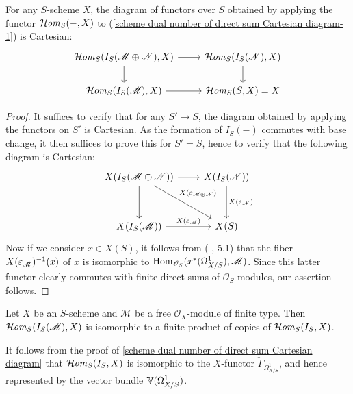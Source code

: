 \begin{proposition}\label{scheme dual number of direct sum Cartesian diagram}
For any $S$-scheme $X$, the diagram of functors over $S$ obtained by applying the functor $\operatorname{\mathcal{H}\hspace*{-0.4pt}\textit{om}\hspace{0.5pt}}_S(-,X)$ to (\ref{scheme dual number of direct sum Cartesian diagram-1}) is Cartesian:
\[\begin{tikzcd}
\sHom_S(I_S(\mathscr{M}\oplus\mathscr{N}),X)\ar[r]\ar[d]&\sHom_S(I_S(\mathscr{N}),X)\ar[d]\\
\sHom_S(I_S(\mathscr{M}),X)\ar[r]&\sHom_S(S,X)=X
\end{tikzcd}\]
\end{proposition}
\begin{proof}
It suffices to verify that for any $S'\to S$, the diagram obtained by applying the functors on $S'$ is Cartesian. As the formation of $I_S(-)$ commutes with base change, it then suffices to prove this for $S'=S$, hence to verify that the following diagram is Cartesian:
\[\begin{tikzcd}[row sep=12mm,column sep=8mm]
X(I_S(\mathscr{M}\oplus\mathscr{N}))\ar[r]\ar[d]\ar[rd,"X(\eps_{\mathscr{M}\oplus\mathscr{N}})",pos=0.4]&X(I_S(\mathscr{N}))\ar[d,"X(\eps_\mathscr{N})"]\\
X(I_S(\mathscr{M}))\ar[r,"X(\eps_\mathscr{M})"]&X(S)
\end{tikzcd}\]
Now if we consider $x\in X(S)$, it follows from (\cite{SGA1} , 5.1) that the fiber $X(\varepsilon_\mathscr{M})^{-1}(x)$ of $x$ is isomorphic to $\mathrm{Hom}_{\mathscr{O}_S}(x^*(\Omega_{X/S}^1),\mathscr{M})$. Since this latter functor clearly commutes with finite direct sums of $\mathscr{O}_S$-modules, our assertion follows.
\end{proof}

\begin{corollary}\label{scheme dual number isomorphic to product}
Let $X$ be an $S$-scheme and $\mathscr{M}$ be a free $\mathscr{O}_X$-module of finite type. Then $\operatorname{\mathcal{H}\hspace*{-0.4pt}\textit{om}\hspace{0.5pt}}_S(I_S(\mathscr{M}),X)$ is isomorphic to a finite product of copies of $\operatorname{\mathcal{H}\hspace*{-0.4pt}\textit{om}\hspace{0.5pt}}_S(I_S,X)$.
\end{corollary}

\begin{remark}\label{scheme dual number Hom represented by vector bundle of Omega}
It follows from the proof of \cref{scheme dual number of direct sum Cartesian diagram} that $\operatorname{\mathcal{H}\hspace*{-0.4pt}\textit{om}\hspace{0.5pt}}_S(I_S,X)$ is isomorphic to the $X$-functor $\check{\Gamma}_{\Omega^1_{X/S}}$, and hence represented by the vector bundle $\mathbb{V}(\Omega_{X/S}^1)$. 
\end{remark}

